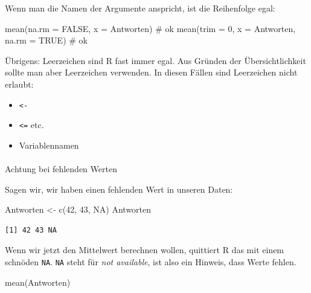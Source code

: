\documentclass[
  letterpaper,
  DIV=11,
  numbers=noendperiod]{scrartcl}
\makeatletter
\let\oldparagraph\paragraph
\renewcommand{\paragraph}{
    \@ifstar
      \xxxParagraphStar
      \xxxParagraphNoStar
  }
\newcommand{\xxxParagraphStar}[1]{\oldparagraph*{#1}\mbox{}}
\newcommand{\xxxParagraphNoStar}[1]{\oldparagraph{#1}\mbox{}}
\newenvironment{Shaded}{\begin{snugshade}}{\end{snugshade}}
\newcommand{\AttributeTok}[1]{\textcolor[rgb]{0.40,0.45,0.13}{#1}}
\newcommand{\CommentTok}[1]{\textcolor[rgb]{0.37,0.37,0.37}{#1}}
\newcommand{\ConstantTok}[1]{\textcolor[rgb]{0.56,0.35,0.01}{#1}}
\newcommand{\DecValTok}[1]{\textcolor[rgb]{0.68,0.00,0.00}{#1}}
\newcommand{\FunctionTok}[1]{\textcolor[rgb]{0.28,0.35,0.67}{#1}}
\newcommand{\NormalTok}[1]{\textcolor[rgb]{0.00,0.23,0.31}{#1}}
\newcommand{\OtherTok}[1]{\textcolor[rgb]{0.00,0.23,0.31}{#1}}
\providecommand{\tightlist}{%
  \setlength{\itemsep}{0pt}\setlength{\parskip}{0pt}}\usepackage{longtable,booktabs,array}
\theoremstyle{definition}
\theoremstyle{definition}
\theoremstyle{definition}
\theoremstyle{remark}
\makeatother
\begin{document}
Wenn man die Namen der Argumente anspricht, ist die Reihenfolge egal:

\begin{Shaded}
\begin{Highlighting}[]
\FunctionTok{mean}\NormalTok{(}\AttributeTok{na.rm =} \ConstantTok{FALSE}\NormalTok{, }\AttributeTok{x =}\NormalTok{ Antworten)  }\CommentTok{\# ok}
\FunctionTok{mean}\NormalTok{(}\AttributeTok{trim =} \DecValTok{0}\NormalTok{, }\AttributeTok{x =}\NormalTok{ Antworten, }\AttributeTok{na.rm =} \ConstantTok{TRUE}\NormalTok{)  }\CommentTok{\# ok}
\end{Highlighting}
\end{Shaded}

Übrigens: Leerzeichen sind R fast immer egal. Aus Gründen der
Übersichtlichkeit sollte man aber Leerzeichen verwenden. In diesen
Fällen sind Leerzeichen nicht erlaubt:

\begin{itemize}
\tightlist
\item
  \texttt{\textless{}-}
\item
  \texttt{\textless{}=} etc.
\item
  Variablennamen
\end{itemize}

\paragraph{Achtung bei fehlenden
Werten}\label{achtung-bei-fehlenden-werten}

Sagen wir, wir haben einen fehlenden Wert in unseren Daten:

\begin{Shaded}
\begin{Highlighting}[]
\NormalTok{Antworten }\OtherTok{\textless{}{-}} \FunctionTok{c}\NormalTok{(}\DecValTok{42}\NormalTok{, }\DecValTok{43}\NormalTok{, }\ConstantTok{NA}\NormalTok{)}
\NormalTok{Antworten}
\end{Highlighting}
\end{Shaded}

\begin{verbatim}
[1] 42 43 NA
\end{verbatim}

Wenn wir jetzt den Mittelwert berechnen wollen, quittiert R das mit
einem schnöden \texttt{NA}. \texttt{NA} steht für \emph{not available},
ist also ein Hinweis, dass Werte fehlen.

\begin{Shaded}
\begin{Highlighting}[]
\FunctionTok{mean}\NormalTok{(Antworten)}
\end{Highlighting}
\end{Shaded}
\end{document}
